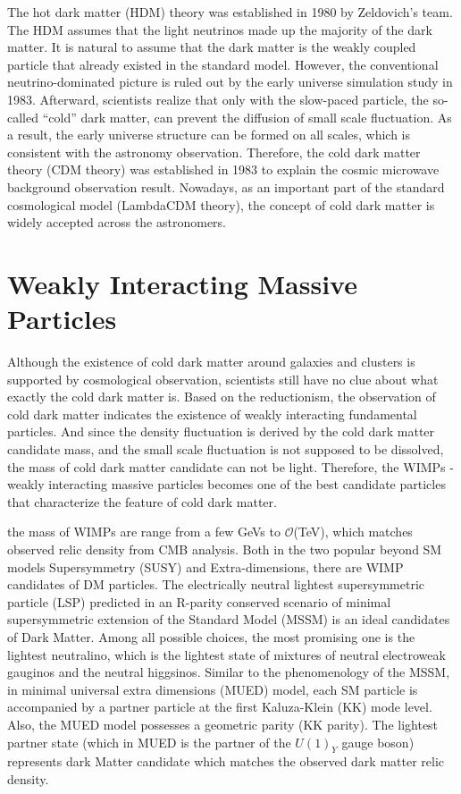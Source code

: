 \par The hot dark matter (HDM) theory\cite{Zeldovich:1982zz} was established in 1980 by Zeldovich's team. The HDM assumes that the light neutrinos made up the majority of the dark matter. It is natural to assume that the dark matter is the weakly coupled particle that already existed in the standard model. However, the conventional neutrino-dominated picture is ruled out by the early universe simulation study in 1983\cite{White:1984yj}. Afterward, scientists realize that only with the slow-paced particle, the so-called ``cold'' dark matter, can prevent the diffusion of small scale fluctuation. As a result, the early universe structure can be formed on all scales, which is consistent with the astronomy observation. Therefore, the cold dark matter theory (CDM theory)\cite{PhysRevLett.48.223} was established in 1983 to explain the cosmic microwave background observation result. Nowadays, as an important part of the standard cosmological model (LambdaCDM theory), the concept of cold dark matter is widely accepted across the astronomers. 

\section{Weakly Interacting Massive Particles}
\label{sec:dms2}
\par Although the existence of cold dark matter around galaxies and clusters is supported by cosmological observation, scientists still have no clue about what exactly the cold dark matter is. Based on the reductionism, the observation of cold dark matter indicates the existence of weakly interacting fundamental particles. And since the density fluctuation is derived by the cold dark matter candidate mass, and the small scale fluctuation is not supposed to be dissolved, the mass of cold dark matter candidate can not be light. Therefore, the WIMPs - weakly interacting massive particles becomes one of the best candidate particles that characterize the feature of cold dark matter.

\par the mass of WIMPs are range from a few GeVs to $\mathcal{O}$(TeV), which matches observed relic density from CMB analysis. Both in the two popular beyond SM models Supersymmetry (SUSY) and Extra-dimensions, there are WIMP candidates of DM particles. The electrically neutral lightest supersymmetric particle (LSP) predicted in an R-parity conserved scenario of minimal supersymmetric extension of the Standard Model (MSSM) is an ideal candidates of Dark Matter. Among all possible choices, the most promising one is the lightest neutralino, which is the lightest state of mixtures of neutral electroweak gauginos and the neutral higgsinos\cite{Feng:2010gw}. Similar to the phenomenology of the MSSM, in minimal universal extra dimensions (MUED) model, each SM particle is accompanied by a partner particle at the first Kaluza-Klein (KK) mode level. Also, the MUED model possesses a geometric parity (KK parity). The lightest partner state (which in MUED is the partner of the $U(1)_Y$ gauge boson) represents dark Matter candidate which matches the observed dark matter relic density\cite{Servant:2002aq}.

